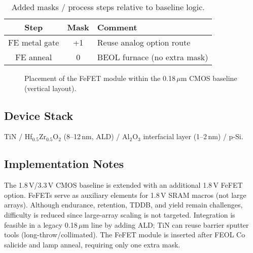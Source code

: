 \documentclass[conference]{IEEEtran}
\begin{document}
\begin{table}[h]
\centering
\caption{Added masks / process steps relative to baseline logic.}
\label{tab:mask}
\begin{tabular}{|c|c|l|}
\hline
Step & Mask & Comment \\
\hline
FE metal gate & +1 & Reuse analog option route \\
FE anneal    & 0  & BEOL furnace (no extra mask) \\
\hline
\end{tabular}
\end{table}

\begin{figure}[h]
\centering
{}
\caption{Placement of the FeFET module within the 0.18\,$\mu$m CMOS baseline (vertical layout).}
\label{fig:flow}
\end{figure}

\subsection{Device Stack}
TiN / Hf$_{0.5}$Zr$_{0.5}$O$_2$ (8--12\,nm, ALD) / Al$_2$O$_3$ interfacial layer (1--2\,nm) / p-Si.

\subsection{Implementation Notes}
The 1.8\,V/3.3\,V CMOS baseline is extended with an additional 1.8\,V FeFET option. FeFETs serve as auxiliary elements for 1.8\,V SRAM macros (not large arrays). Although endurance, retention, TDDB, and yield remain challenges, difficulty is reduced since large-array scaling is not targeted. Integration is feasible in a legacy 0.18\,$\mu$m line by adding ALD; TiN can reuse barrier sputter tools (long-throw/collimated). The FeFET module is inserted after FEOL Co salicide and lamp anneal, requiring only one extra mask.
\end{document}
